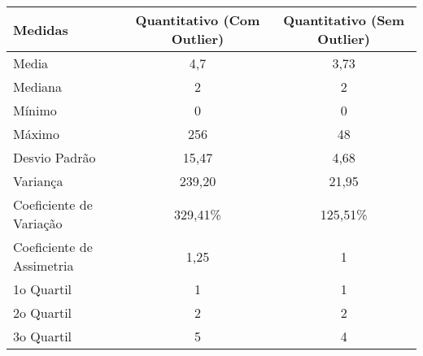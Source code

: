     \begin{tabular}{l c c}
        \hline Medidas & Quantitativo (Com Outlier) & Quantitativo (Sem Outlier) \\
        \hline        
Media                     & 4,7                        & 3,73                       \\
Mediana                   & 2                          & 2                          \\
Mínimo                    & 0                          & 0                          \\
Máximo                    & 256                        & 48                         \\
Desvio Padrão             & 15,47                      & 4,68                       \\
Variança                  & 239,20                     & 21,95                      \\
Coeficiente de Variação   & 329,41\%                   & 125,51\%                   \\
Coeficiente de Assimetria & 1,25                       & 1                          \\
1o Quartil                 & 1                          & 1                          \\
2o Quartil                 & 2                          & 2                          \\
3o Quartil                 & 5                          & 4                          \\
        \hline
    \end{tabular}